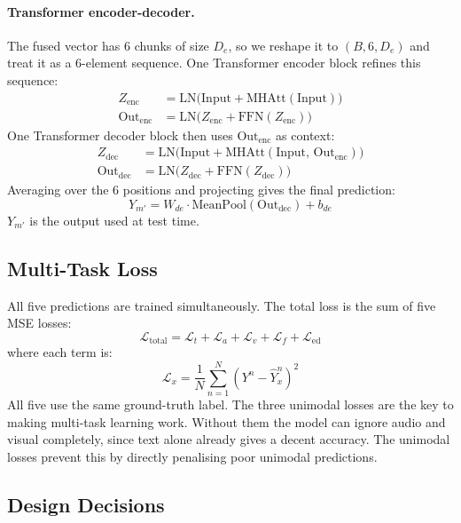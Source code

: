 \documentclass[11pt,twocolumn]{article}
\begin{document}
\paragraph{Transformer encoder-decoder.}
The fused vector has 6 chunks of size $D_e$, so we reshape it to $(B, 6, D_e)$ and treat it as a 6-element sequence. One Transformer encoder block refines this sequence:
\begin{align}
Z_{\text{enc}} &= \text{LN}\bigl(\text{Input} + \text{MHAtt}(\text{Input})\bigr) \\
\text{Out}_{\text{enc}} &= \text{LN}\bigl(Z_{\text{enc}} + \text{FFN}(Z_{\text{enc}})\bigr)
\end{align}
One Transformer decoder block then uses $\text{Out}_{\text{enc}}$ as context:
\begin{align}
Z_{\text{dec}} &= \text{LN}\bigl(\text{Input} + \text{MHAtt}(\text{Input},\,\text{Out}_{\text{enc}})\bigr) \\
\text{Out}_{\text{dec}} &= \text{LN}\bigl(Z_{\text{dec}} + \text{FFN}(Z_{\text{dec}})\bigr)
\end{align}
Averaging over the 6 positions and projecting gives the final prediction:
\begin{equation}
Y_{m'} = W_{de}\cdot\text{MeanPool}(\text{Out}_{\text{dec}}) + b_{de}
\end{equation}
$Y_{m'}$ is the output used at test time.

\subsection{Multi-Task Loss}

All five predictions are trained simultaneously. The total loss is the sum of five MSE losses:
\begin{equation}
\mathcal{L}_{\text{total}} = \mathcal{L}_t + \mathcal{L}_a + \mathcal{L}_v + \mathcal{L}_f + \mathcal{L}_{\text{ed}}
\end{equation}
where each term is:
\begin{equation}
\mathcal{L}_x = \frac{1}{N} \sum_{n=1}^{N} (Y^n - \hat{Y}_x^n)^2
\end{equation}
All five use the same ground-truth label. The three unimodal losses are the key to making multi-task learning work. Without them the model can ignore audio and visual completely, since text alone already gives a decent accuracy. The unimodal losses prevent this by directly penalising poor unimodal predictions.

\subsection{Design Decisions}
\end{document}

